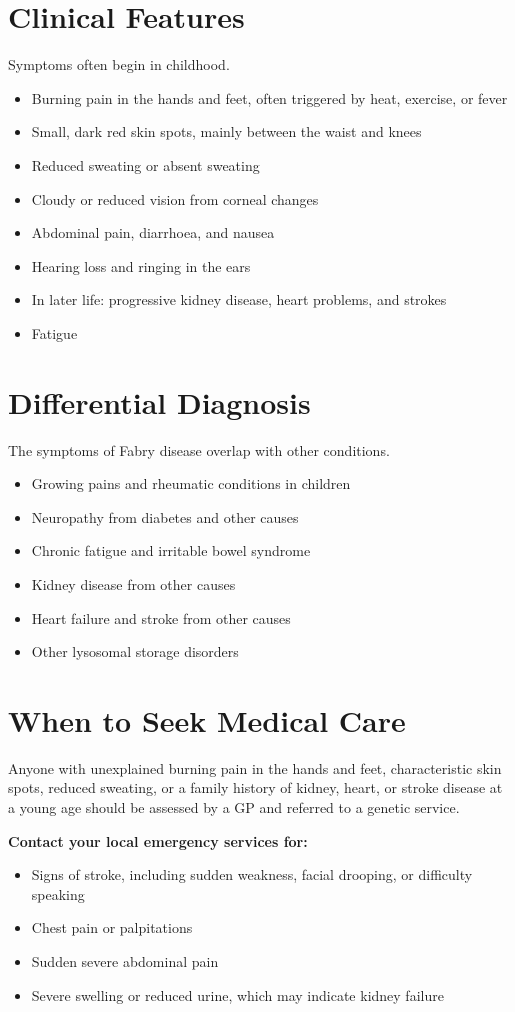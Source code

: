 \section*{Clinical Features}
Symptoms often begin in childhood.
\begin{itemize}
    \item Burning pain in the hands and feet, often triggered by heat, exercise, or fever
    \item Small, dark red skin spots, mainly between the waist and knees
    \item Reduced sweating or absent sweating
    \item Cloudy or reduced vision from corneal changes
    \item Abdominal pain, diarrhoea, and nausea
    \item Hearing loss and ringing in the ears
    \item In later life: progressive kidney disease, heart problems, and strokes
    \item Fatigue
\end{itemize}

\section*{Differential Diagnosis}
The symptoms of Fabry disease overlap with other conditions.
\begin{itemize}
    \item Growing pains and rheumatic conditions in children
    \item Neuropathy from diabetes and other causes
    \item Chronic fatigue and irritable bowel syndrome
    \item Kidney disease from other causes
    \item Heart failure and stroke from other causes
    \item Other lysosomal storage disorders
\end{itemize}

\section*{When to Seek Medical Care}
Anyone with unexplained burning pain in the hands and feet, characteristic skin spots, reduced sweating, or a family history of kidney, heart, or stroke disease at a young age should be assessed by a GP and referred to a genetic service.

\textbf{Contact your local emergency services for:}
\begin{itemize}
    \item Signs of stroke, including sudden weakness, facial drooping, or difficulty speaking
    \item Chest pain or palpitations
    \item Sudden severe abdominal pain
    \item Severe swelling or reduced urine, which may indicate kidney failure
\end{itemize}


